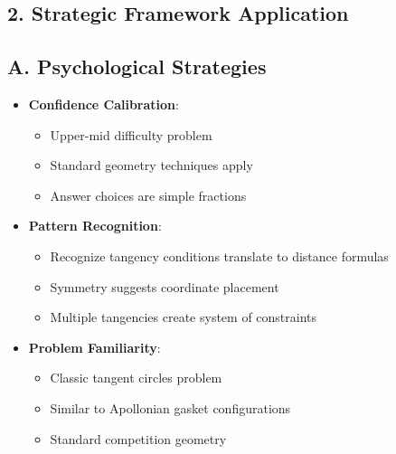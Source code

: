 \documentclass[11pt]{article}
\begin{document}
\begin{strategybox}
\section*{2. Strategic Framework Application}

\subsection*{A. Psychological Strategies}
\begin{itemize}[leftmargin=*]
    \item \textbf{Confidence Calibration}: 
    \begin{itemize}
        \item Upper-mid difficulty problem
        \item Standard geometry techniques apply
        \item Answer choices are simple fractions
    \end{itemize}
    \item \textbf{Pattern Recognition}:
    \begin{itemize}
        \item Recognize tangency conditions translate to distance formulas
        \item Symmetry suggests coordinate placement
        \item Multiple tangencies create system of constraints
    \end{itemize}
    \item \textbf{Problem Familiarity}:
    \begin{itemize}
        \item Classic tangent circles problem
        \item Similar to Apollonian gasket configurations
        \item Standard competition geometry
    \end{itemize}
\end{itemize}


\end{strategybox}
\end{document}
